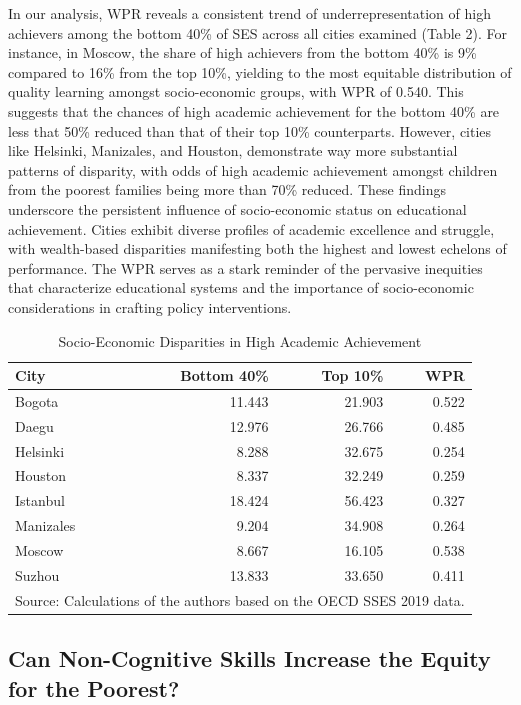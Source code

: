 \documentclass[
  12pt,
  a4paper,
]{article}
\begin{document}
In our analysis, WPR reveals a consistent trend of underrepresentation
of high achievers among the bottom 40\% of SES across all cities
examined (Table 2). For instance, in Moscow, the share of high achievers
from the bottom 40\% is 9\% compared to 16\% from the top 10\%, yielding
to the most equitable distribution of quality learning amongst
socio-economic groups, with WPR of 0.540. This suggests that the chances
of high academic achievement for the bottom 40\% are less that 50\%
reduced than that of their top 10\% counterparts. However, cities like
Helsinki, Manizales, and Houston, demonstrate way more substantial
patterns of disparity, with odds of high academic achievement amongst
children from the poorest families being more than 70\% reduced. These
findings underscore the persistent influence of socio-economic status on
educational achievement. Cities exhibit diverse profiles of academic
excellence and struggle, with wealth-based disparities manifesting both
the highest and lowest echelons of performance. The WPR serves as a
stark reminder of the pervasive inequities that characterize educational
systems and the importance of socio-economic considerations in crafting
policy interventions.

\begin{table}

\caption{\label{tab:equity}Socio-Economic Disparities in High Academic Achievement}
\centering
\begin{tabular}[t]{lrrr}
\toprule
City & Bottom 40\% & Top 10\% & WPR\\
\midrule
Bogota & 11.443 & 21.903 & 0.522\\
Daegu & 12.976 & 26.766 & 0.485\\
Helsinki & 8.288 & 32.675 & 0.254\\
Houston & 8.337 & 32.249 & 0.259\\
Istanbul & 18.424 & 56.423 & 0.327\\
\addlinespace
Manizales & 9.204 & 34.908 & 0.264\\
Moscow & 8.667 & 16.105 & 0.538\\
Suzhou & 13.833 & 33.650 & 0.411\\
\bottomrule
\multicolumn{4}{l}{\rule{0pt}{1em}Source: Calculations of the authors based on the OECD SSES 2019 data.}\\
\end{tabular}
\end{table}

\hypertarget{can-non-cognitive-skills-increase-the-equity-for-the-poorest}{%
\subsection{Can Non-Cognitive Skills Increase the Equity for the
Poorest?}\label{can-non-cognitive-skills-increase-the-equity-for-the-poorest}}
\end{document}
